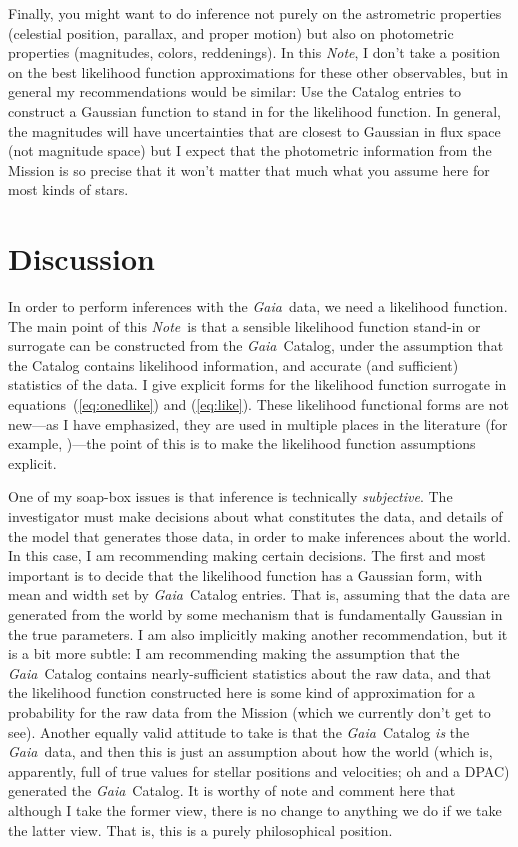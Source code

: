 \documentclass[12pt, modern]{aastex62h}
\newcommand{\acronym}[1]{{\small{#1}}}
\newcommand{\Gaia}{\textsl{Gaia}}
\newcommand{\DPAC}{{\acronym{DPAC}}}
\newcommand{\documentname}{\textsl{Note}}
\newcommand{\equationname}{equation}
\begin{document}
Finally, you might want to do inference not purely on the astrometric
properties (celestial position, parallax, and proper motion) but also
on photometric properties (magnitudes, colors, reddenings).
In this \documentname, I don't take a position on the best likelihood function
approximations for these other observables, but in general my recommendations
would be similar: Use the Catalog entries to construct a Gaussian function
to stand in for the likelihood function.
In general, the magnitudes will have uncertainties that are closest to
Gaussian in flux space (not magnitude space) but I expect that the photometric
information from the Mission is so precise that it won't matter that much
what you assume here for most kinds of stars.

\section{Discussion}
In order to perform inferences
with the \Gaia\ data, we need a likelihood function.
The main point of this \documentname\ is that a sensible likelihood function
stand-in or surrogate can be constructed from the \Gaia\ Catalog, under the assumption
that the Catalog contains likelihood information, and accurate (and sufficient)
statistics of the data.
I give explicit forms for the likelihood function surrogate in
\equationname s~(\ref{eq:onedlike}) and (\ref{eq:like}).
These likelihood functional forms are not new---as I have emphasized,
they are used in multiple places
in the literature (for example, \citealt{tri2, leistedt, oh, delgado})---the point of
this is to make the
likelihood function assumptions explicit.

One of my soap-box issues is that inference is technically \emph{subjective}.
The investigator must make decisions about what constitutes the data,
and details of the model that generates those data, in order to make
inferences about the world.
In this case, I am recommending making certain decisions.
The first and most important is to decide that the likelihood function
has a Gaussian form, with mean and width set by \Gaia\ Catalog entries.
That is, assuming that the data are generated from the world by some mechanism
that is fundamentally Gaussian in the true parameters.
I am also implicitly making another recommendation, but it is a bit more
subtle:
I am recommending making the assumption that the \Gaia\ Catalog contains
nearly-sufficient statistics about the raw data, and that the likelihood function
constructed here is some kind of approximation for a probability for the raw data
from the Mission (which we currently don't get to see).
Another equally valid attitude to take is that the \Gaia\ Catalog
\emph{is}
the \Gaia\ data, and then this is just an assumption about how the world
(which is, apparently, full of true values for stellar positions and velocities;
oh and a \DPAC)
generated the \Gaia\ Catalog.
It is worthy of note and comment here that although I take the former view,
there is no change to anything we do if we take the latter view.
That is, this is a purely philosophical position.
\end{document}
